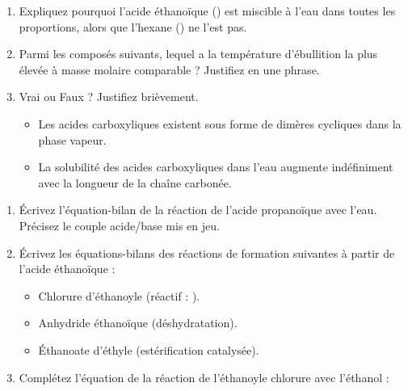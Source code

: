 \documentclass[11pt]{article}
\begin{document}
\begin{exercice}
\begin{enumerate}
    \item Expliquez pourquoi l'acide éthanoïque () est miscible à l'eau dans toutes les proportions, alors que l'hexane () ne l'est pas.
    \item Parmi les composés suivants, lequel a la température d'ébullition la plus élevée à masse molaire comparable ? Justifiez en une phrase.
    \begin{center}
     \quad {} \quad {}
    \end{center}
    \item Vrai ou Faux ? Justifiez brièvement.
    \begin{itemize}
        \item Les acides carboxyliques existent sous forme de dimères cycliques dans la phase vapeur.
        \item La solubilité des acides carboxyliques dans l'eau augmente indéfiniment avec la longueur de la chaîne carbonée.
    \end{itemize}
\end{enumerate}
\end{exercice}

\begin{exercice}
\begin{enumerate}
    \item Écrivez l'équation-bilan de la réaction de l'acide propanoïque avec l'eau. Précisez le couple acide/base mis en jeu.
    \item Écrivez les équations-bilans des réactions de formation suivantes à partir de l'acide éthanoïque :
    \begin{itemize}
        \item Chlorure d'éthanoyle (réactif : ).
        \item Anhydride éthanoïque (déshydratation).
        \item Éthanoate d'éthyle (estérification catalysée).
    \end{itemize}
    \item Complétez l'équation de la réaction de l'éthanoyle chlorure avec l'éthanol :
\end{enumerate}
\end{exercice}
\end{document}
